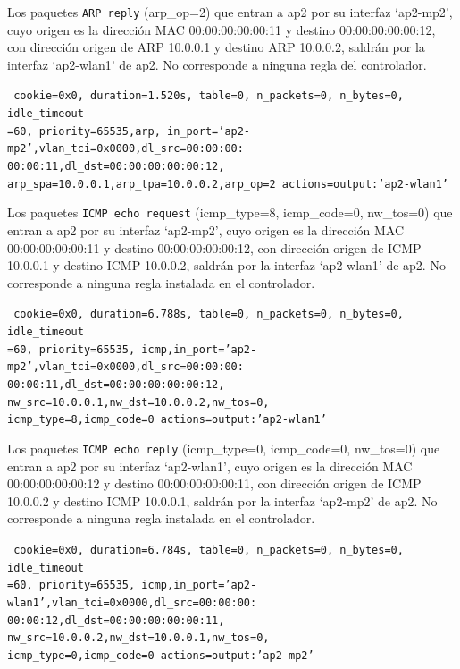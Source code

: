 \documentclass[a4paper,12pt,twoside,spanish]{book}
\begin{document}
Los paquetes \texttt{ARP reply} (arp\_op=2) que entran a ap2 por su interfaz ‘ap2-mp2’, cuyo origen es la dirección MAC 00:00:00:00:00:11 y destino 00:00:00:00:00:12, con dirección origen de ARP 10.0.0.1 y destino ARP 10.0.0.2, saldrán por la interfaz ‘ap2-wlan1’ de ap2. No corresponde a ninguna regla del controlador.\par 

\noindent\texttt{
	cookie=0x0, duration=1.520s, table=0, n\_packets=0, n\_bytes=0, idle\_timeout\\
	=60, priority=65535,arp,
	in\_port='ap2-mp2',vlan\_tci=0x0000,dl\_src=00:00:00:\\
	00:00:11,dl\_dst=00:00:00:00:00:12,
	arp\_spa=10.0.0.1,arp\_tpa=10.0.0.2,arp\_op=2 actions=output:'ap2-wlan1'
}

Los paquetes \texttt{ICMP echo request} (icmp\_type=8, icmp\_code=0, nw\_tos=0) que entran a ap2 por su interfaz ‘ap2-mp2’, cuyo origen es la dirección MAC 00:00:00:00:00:11 y destino 00:00:00:00:00:12, con dirección origen de ICMP 10.0.0.1 y destino ICMP 10.0.0.2, saldrán por la interfaz ‘ap2-wlan1’ de ap2. No corresponde a ninguna regla instalada en el controlador.\par 

\noindent\texttt{
	cookie=0x0, duration=6.788s, table=0, n\_packets=0, n\_bytes=0, idle\_timeout\\
	=60, priority=65535,
	icmp,in\_port='ap2-mp2',vlan\_tci=0x0000,dl\_src=00:00:00:\\
	00:00:11,dl\_dst=00:00:00:00:00:12,
	nw\_src=10.0.0.1,nw\_dst=10.0.0.2,nw\_tos=0,\\
	icmp\_type=8,icmp\_code=0 actions=output:'ap2-wlan1'
}

Los paquetes \texttt{ICMP echo reply} (icmp\_type=0, icmp\_code=0, nw\_tos=0) que entran a ap2 por su interfaz ‘ap2-wlan1’, cuyo origen es la dirección MAC 00:00:00:00:00:12 y destino 00:00:00:00:00:11, con dirección origen de ICMP 10.0.0.2 y destino ICMP 10.0.0.1, saldrán por la interfaz ‘ap2-mp2’ de ap2. No corresponde a ninguna regla instalada en el controlador.\par 

\noindent\texttt{
	cookie=0x0, duration=6.784s, table=0, n\_packets=0, n\_bytes=0, idle\_timeout\\
	=60, priority=65535,
	icmp,in\_port='ap2-wlan1',vlan\_tci=0x0000,dl\_src=00:00:00:\\
	00:00:12,dl\_dst=00:00:00:00:00:11,
	nw\_src=10.0.0.2,nw\_dst=10.0.0.1,nw\_tos=0,\\
	icmp\_type=0,icmp\_code=0 actions=output:'ap2-mp2'
}
\end{document}
